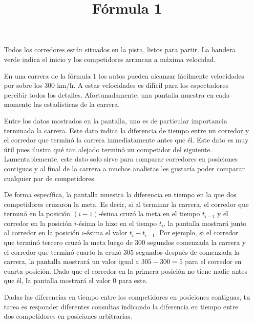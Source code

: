 \documentclass{oci}
\title{Fórmula 1}
\begin{document}
\begin{problemDescription}
  Todos los corredores están situados en la pista, listos para partir.
  La bandera verde indica el inicio y los competidores arrancan a máxima velocidad.

  En una carrera de la fórmula 1 los autos pueden alcanzar fácilmente velocidades por sobre los 300 km/h.
  A estas velocidades es difícil para los espectadores percibir todos los detalles.
  Afortunadamente, una pantalla muestra en cada momento las estadísticas de la carrera.

  Entre los datos mostrados en la pantalla, uno es de particular importancia terminada la carrera.
  Este dato indica la diferencia de tiempo entre un corredor y el
  corredor que terminó la carrera inmediatamente antes que él.
  Este dato es muy útil pues ilustra qué tan alejado terminó un competidor del siguiente.
  Lamentablemente, este dato solo sirve para comparar corredores en posiciones contiguas y al final
  de la carrera a muchos analistas les gustaría poder comparar cualquier par de competidores.

  De forma específica, la pantalla muestra la diferencia en tiempo en la que dos competidores
  cruzaron la meta.
  Es decir, si al terminar la carrera, el corredor que terminó en la posición $(i-1)$-ésima cruzó la
  meta en el tiempo $t_{i-1}$ y el corredor en la posición $i$-ésima lo hizo en el tiempo $t_{i}$,
  la pantalla mostrará junto al corredor en la posición $i$-ésima el valor $t_{i} - t_{i-1}$.
  Por ejemplo, si el corredor que terminó tercero cruzó la meta luego de 300 segundos
  comenzada la carrera y el corredor que terminó cuarto la cruzó 305 segundos después de comenzada la
  carrera, la pantalla mostrará un valor igual a $305-300=5$ para el corredor en cuarta posición.
  Dado que el corredor en la primera posición no tiene nadie antes que él, la pantalla mostrará
  el valor 0 para este.

  Dadas las diferencias en tiempo entre los competidores en posiciones contiguas, tu tarea es
  responder diferentes consultas indicando la diferencia en tiempo entre dos competidores en
  posiciones arbitrarias.
\end{problemDescription}
\end{document}
